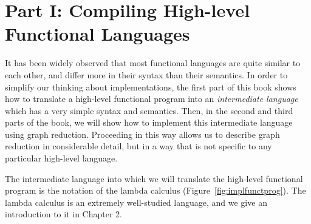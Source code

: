 \section{Part I: Compiling High-level Functional Languages}
It has been widely observed that most functional languages are quite similar to
each other, and differ more in their syntax than their semantics. In order to
simplify our thinking about implementations, the first part of this book shows
how to translate a high-level functional program into an \textit{intermediate language}
which has a very simple syntax and semantics. Then, in the second and third
parts of the book, we will show how to implement this intermediate language
using graph reduction. Proceeding in this way allows us to describe graph
reduction in considerable detail, but in a way that is not specific to any
particular high-level language.

The intermediate language into which we will translate the high-level
functional program is the notation of the lambda calculus (Figure~\ref{fig:implfunctprog}). The
lambda calculus is an extremely well-studied language, and we give an introduction
to it in Chapter 2.





